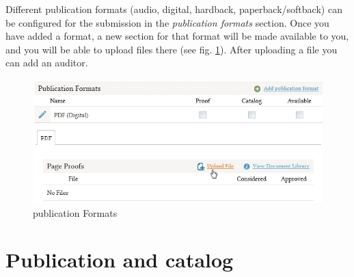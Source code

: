 Different publication formats (audio, digital, hardback, paperback/softback) can be configured for the submission in the \textit{publication formats} section. Once you have added a format, a new section for that format will be made available to you, and you will be able to upload files there (see fig. \ref{fig:publicationFormats}). After uploading a file you can add an auditor.

\begin{figure}[h] \centering
\includegraphics[width=1\textwidth]{./img/publicationFormats.jpg} \caption{publication Formats}
\label{fig:publicationFormats}
\end{figure}




\newpage


\section{Publication and catalog} \label{sec:catalog}

